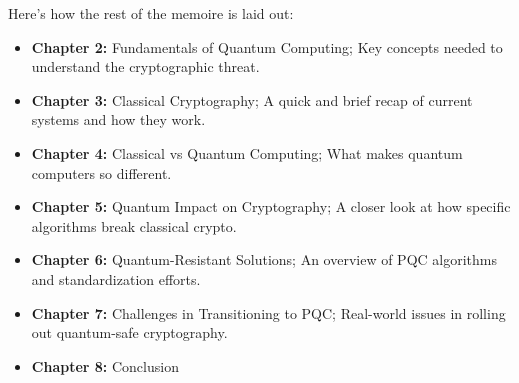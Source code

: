 Here's how the rest of the memoire is laid out:
\begin{itemize}
\item \textbf{Chapter 2:} Fundamentals of Quantum Computing; Key concepts needed to understand the cryptographic threat.
\item \textbf{Chapter 3:} Classical Cryptography; A quick and brief recap of current systems and how they work.
\item \textbf{Chapter 4:} Classical vs Quantum Computing; What makes quantum computers so different.
\item \textbf{Chapter 5:} Quantum Impact on Cryptography; A closer look at how specific algorithms break classical crypto.
\item \textbf{Chapter 6:} Quantum-Resistant Solutions; An overview of PQC algorithms and standardization efforts.
\item \textbf{Chapter 7:} Challenges in Transitioning to PQC; Real-world issues in rolling out quantum-safe cryptography.
\item \textbf{Chapter 8:} Conclusion
\end{itemize}